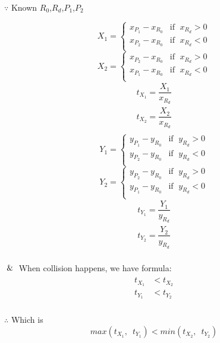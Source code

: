 $\because$ Known $R_0$,\enspace$R_d$,\enspace$P_1$,\enspace$P_2$
\begin{multicols}{2}
\noindent
\[
X_1 =
\begin{cases}
x_{P_1} - x_{R_0} & \text{if }\;x_{R_d} > 0\\
x_{P_2} - x_{R_0} & \text{if }\;x_{R_d} < 0\\
\end{cases}
\]
\[
X_2 =
\begin{cases}
x_{P_2} - x_{R_0} & \text{if }\;x_{R_d} > 0\\
x_{P_1} - x_{R_0} & \text{if }\;x_{R_d} < 0\\
\end{cases}
\]
\[
\begin{array}{lr}
t_{X_1} = \dfrac{X_1}{x_{R_d}}\\
t_{X_2} = \dfrac{X_2}{x_{R_d}}\\
\end{array}
\]
\columnbreak
\[
Y_1 =
\begin{cases}
y_{P_1} - y_{R_0} & \text{if }\;y_{R_d} > 0\\
y_{P_2} - y_{R_0} & \text{if }\;y_{R_d} < 0\\
\end{cases}
\]
\[
Y_2 =
\begin{cases}
y_{P_2} - y_{R_0} & \text{if }\;y_{R_d} > 0\\
y_{P_1} - y_{R_0} & \text{if }\;y_{R_d} < 0\\
\end{cases}
\]
\[
\begin{array}{lr}
t_{Y_1} = \dfrac{Y_1}{y_{R_d}}\\
t_{Y_2} = \dfrac{Y_2}{y_{R_d}}\\
\end{array}
\]
\end{multicols}

$\And$ When collision happens, we have formula:
\[
\begin{array}{lr}
\begin{aligned}
t_{X_1} &< t_{X_2}\\
t_{Y_1} &< t_{Y_2}\\
\end{aligned}
\end{array}
\]

$\therefore$ Which is
\begin{equation}
\label{equ:ray-box-2d-intersection}
max(t_{X_1},\enspace t_{Y_1}) < min(t_{X_2},\enspace t_{Y_2})
\end{equation}

